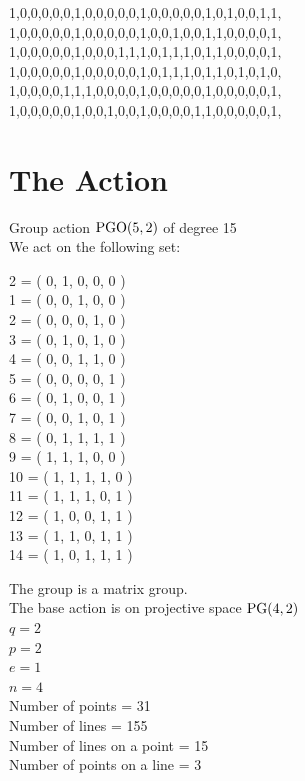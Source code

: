 1,0,0,0,0,0,1,0,0,0,0,0,1,0,0,0,0,0,1,0,1,0,0,1,1,\\
1,0,0,0,0,0,1,0,0,0,0,0,1,0,0,1,0,0,1,1,0,0,0,0,1,\\
1,0,0,0,0,0,1,0,0,0,1,1,1,0,1,1,1,0,1,1,0,0,0,0,1,\\
1,0,0,0,0,0,1,0,0,0,0,0,1,0,1,1,1,0,1,1,0,1,0,1,0,\\
1,0,0,0,0,1,1,1,0,0,0,0,1,0,0,0,0,0,1,0,0,0,0,0,1,\\
1,0,0,0,0,0,1,0,0,1,0,0,1,0,0,0,0,1,1,0,0,0,0,0,1,\\
\section*{The Action}
Group action ${\rm PGO}(5,2)$ of degree 15\\
We act on the following set:\\
\begin{multicols}{2}
 = ( 0, 1, 0, 0, 0 )\\
1 = ( 0, 0, 1, 0, 0 )\\
2 = ( 0, 0, 0, 1, 0 )\\
3 = ( 0, 1, 0, 1, 0 )\\
4 = ( 0, 0, 1, 1, 0 )\\
5 = ( 0, 0, 0, 0, 1 )\\
6 = ( 0, 1, 0, 0, 1 )\\
7 = ( 0, 0, 1, 0, 1 )\\
8 = ( 0, 1, 1, 1, 1 )\\
9 = ( 1, 1, 1, 0, 0 )\\
10 = ( 1, 1, 1, 1, 0 )\\
11 = ( 1, 1, 1, 0, 1 )\\
12 = ( 1, 0, 0, 1, 1 )\\
13 = ( 1, 1, 0, 1, 1 )\\
14 = ( 1, 0, 1, 1, 1 )\\
\end{multicols}
The group is a matrix group.\\
The base action is on projective space ${\rm PG}(4, 2)$\\
$q = 2$\\
$p = 2$\\
$e = 1$\\
$n = 4$\\
Number of points = 31\\
Number of lines = 155\\
Number of lines on a point = 15\\
Number of points on a line = 3\\
